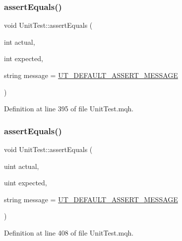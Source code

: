 \mbox{\label{class_unit_test_a0e871d748e708b0acfdf5cc3a7533517}} 
\subsubsection{\texorpdfstring{assert\+Equals()}{assertEquals()}\hspace{0.1cm}{\footnotesize\ttfamily [6/28]}}
{\footnotesize\ttfamily void Unit\+Test\+::assert\+Equals (\begin{DoxyParamCaption}\item[{int}]{actual,  }\item[{int}]{expected,  }\item[{string}]{message = {\ttfamily \mbox{\hyperlink{_unit_test_8mqh_a96f5d62188d09039ebc3f443c9120e39}{U\+T\+\_\+\+D\+E\+F\+A\+U\+L\+T\+\_\+\+A\+S\+S\+E\+R\+T\+\_\+\+M\+E\+S\+S\+A\+GE}}} }\end{DoxyParamCaption})}



Definition at line 395 of file Unit\+Test.\+mqh.

\mbox{\label{class_unit_test_ac2ce73c4eaf229c641de1d282329d611}} 
\subsubsection{\texorpdfstring{assert\+Equals()}{assertEquals()}\hspace{0.1cm}{\footnotesize\ttfamily [7/28]}}
{\footnotesize\ttfamily void Unit\+Test\+::assert\+Equals (\begin{DoxyParamCaption}\item[{uint}]{actual,  }\item[{uint}]{expected,  }\item[{string}]{message = {\ttfamily \mbox{\hyperlink{_unit_test_8mqh_a96f5d62188d09039ebc3f443c9120e39}{U\+T\+\_\+\+D\+E\+F\+A\+U\+L\+T\+\_\+\+A\+S\+S\+E\+R\+T\+\_\+\+M\+E\+S\+S\+A\+GE}}} }\end{DoxyParamCaption})}



Definition at line 408 of file Unit\+Test.\+mqh.

\mbox{\label{class_unit_test_a3c0a3687590c54221a78c3f4fec08f4a}} 
